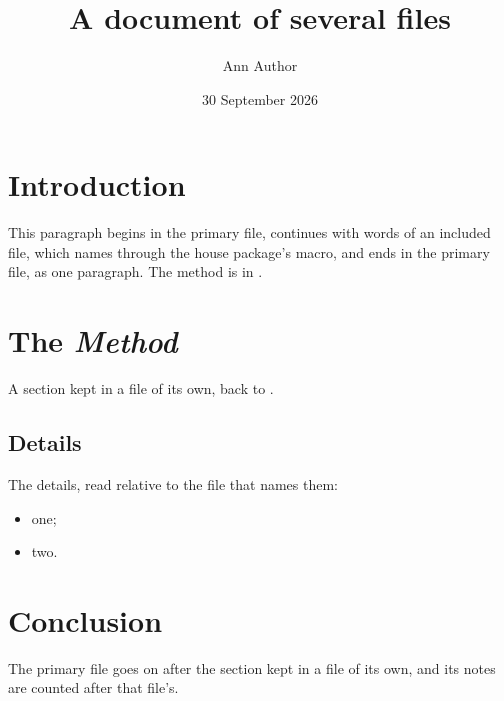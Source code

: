 \documentclass[twocolumn]{article}
\begin{document}
\title{A document of several files}
\author{Ann Author}
\date{30 September 2026}
\maketitle
\flmHeading[toc=true]
\section{Introduction}{\flmLabels{\label{ref1}}}

This paragraph begins in the primary file, continues with words of an included file, which names \flmUDproject{} through the house
package's macro,
 and ends in the primary
file, as one paragraph. The method is in .

\flmHeading[toc=true]
\section{The \emph{Method}}{\flmLabels{\label{ref2}}}
A section kept in a file of its own, back to .

\flmHeading[toc=true]
\subsection{Details}{\flmLabels{}}

The details, read relative to the file that names them:
\begin{itemize}
\item one;
\item two.
\end{itemize}



\flmHeading[toc=true]
\section{Conclusion}{\flmLabels{}}

The primary file goes on after the section kept in a file of its own, and its notes are
counted after that file's.
\end{document}
